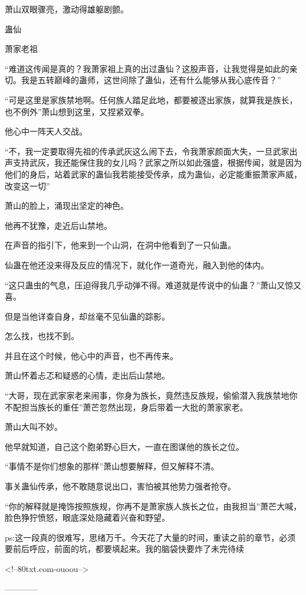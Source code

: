 \begin{this_body}
萧山双眼骤亮，激动得雄躯剧颤。

蛊仙

萧家老祖

“难道这传闻是真的？我萧家祖上真的出过蛊仙？这股声音，让我觉得是如此的亲切。我是五转巅峰的蛊师，这世间除了蛊仙，还有什么能够从我心底传音？”

“可是这里是家族禁地啊。任何族人踏足此地，都要被逐出家族，就算我是族长，也不例外”萧山想到这里，又捏紧双拳。

他心中一阵天人交战。

“不，我一定要取得先祖的传承武灰这么闹下去，令我萧家颜面大失，一旦武家出声支持武灰，我还能保住我的女儿吗？武家之所以如此强盛，根据传闻，就是因为他们的身后，站着武家的蛊仙我若能接受传承，成为蛊仙，必定能重振萧家声威，改变这一切”

萧山的脸上，涌现出坚定的神色。

他再不犹豫，走近后山禁地。

在声音的指引下，他来到一个山洞，在洞中他看到了一只仙蛊。

仙蛊在他还没来得及反应的情况下，就化作一道奇光，融入到他的体内。

“这只蛊虫的气息，压迫得我几乎动弹不得。难道就是传说中的仙蛊？”萧山又惊又喜。

但是当他详查自身，却丝毫不见仙蛊的踪影。

怎么找，也找不到。

并且在这个时候，他心中的声音，也不再传来。

萧山怀着忐忑和疑惑的心情，走出后山禁地。

“大哥，现在武家家老来闹事，你身为族长，竟然违反族规，偷偷潜入我族禁地你不配担当族长的重任”萧芒忽然出现，身后带着一大批的萧家家老。

萧山大叫不妙。

他早就知道，自己这个胞弟野心巨大，一直在图谋他的族长之位。

“事情不是你们想象的那样”萧山想要解释，但又解释不清。

事关蛊仙传承，他不敢随意说出口，害怕被其他势力强者抢夺。

“你的解释就是掩饰按照族规，你再不是萧家族人族长之位，由我担当”萧芒大喊，脸色狰狞愤怒，眼底深处隐藏着兴奋和野望。

ps:这一段真的很难写，思绪万千。今天花了大量的时间，重读之前的章节，必须要前后呼应，前面的坑，都要填起来。我的脑袋快要炸了未完待续

<!--80txt.com-ouoou-->

------------

\end{this_body}


